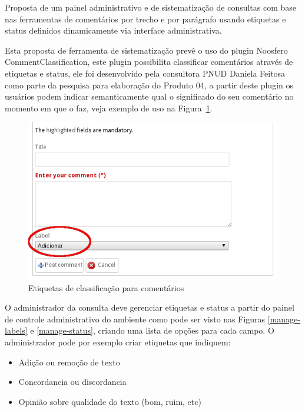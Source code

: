 \documentclass[12pt]{article}
\begin{document}
Proposta de um painel administrativo e de sistematização de consultas com base
nas ferramentas de comentários por trecho e por parágrafo usando etiquetas e
status definidos dinamicamente via interface administrativa.

Esta proposta de ferramenta de sistematização prevê o uso do plugin Noosfero
CommentClassification\cite{commentClassificationPlugin}, este plugin
possibilita classificar comentários através de etiquetas e status, ele foi
desenvolvido pela consultora PNUD Daniela Feitosa como
parte da pesquisa para elaboração do Produto 04, a partir
deste plugin os usuários podem indicar semanticamente qual o significado do
seu comentário no momento em que o faz, veja exemplo de uso na
Figura~\ref{etiqueta}.

\begin{figure}[h]
\center
\includegraphics[scale=0.5]{etiqueta.png}
\caption{Etiquetas de classificação para comentários}
\label{etiqueta}
\end{figure}

O administrador da consulta deve gerenciar etiquetas e status a partir do
painel de controle administrativo do ambiente como pode ser visto nas Figuras
\ref{manage-labels} e \ref{manage-status}, criando uma lista de opções para
cada campo. O administrador pode por exemplo criar etiquetas que indiquem:

\begin{itemize}
  \item Adição ou remoção de texto
  \item Concordancia ou discordancia
  \item Opinião sobre qualidade do texto (bom, ruim, etc)
\end{itemize}
\end{document}

